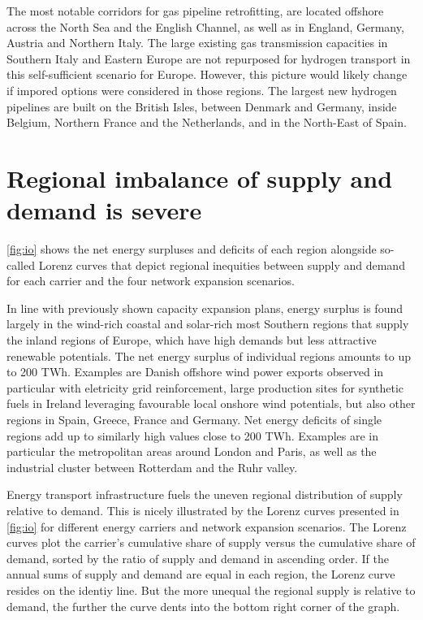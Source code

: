 The most notable corridors for gas pipeline retrofitting, are located offshore
across the North Sea and the English Channel, as well as in England, Germany,
Austria and Northern Italy. The large existing gas transmission capacities in
Southern Italy and Eastern Europe are not repurposed for hydrogen transport in
this self-sufficient scenario for Europe. However, this picture would likely
change if impored options were considered in those regions. The largest new
hydrogen pipelines are built on the British Isles, between Denmark and Germany,
inside Belgium, Northern France and the Netherlands, and in the North-East of
Spain.


\section*{Regional imbalance of supply and demand is severe}
\label{sec:imbalance}

\cref{fig:io} shows the net energy surpluses and deficits of each region
alongside so-called Lorenz curves that depict regional inequities between supply
and demand for each carrier and the four network expansion scenarios.

In line with previously shown capacity expansion plans, energy surplus is found
largely in the wind-rich coastal and solar-rich most Southern regions that
supply the inland regions of Europe, which have high demands but less attractive
renewable potentials. The net energy surplus of individual regions amounts to up
to 200 TWh. Examples are Danish offshore wind power exports observed in
particular with eletricity grid reinforcement, large production sites for
synthetic fuels in Ireland leveraging favourable local onshore wind potentials,
but also other regions in Spain, Greece, France and Germany. Net energy deficits
of single regions add up to similarly high values close to 200 TWh. Examples are
in particular the metropolitan areas around London and Paris, as well as the
industrial cluster between Rotterdam and the Ruhr valley.

Energy transport infrastructure fuels the uneven regional distribution of supply
relative to demand. This is nicely illustrated by the Lorenz curves presented in
\cref{fig:io} for different energy carriers and network expansion scenarios. The
Lorenz curves plot the carrier's cumulative share of supply versus the
cumulative share of demand, sorted by the ratio of supply and demand in
ascending order. If the annual sums of supply and demand are equal in each
region, the Lorenz curve resides on the identiy line. But the more unequal the
regional supply is relative to demand, the further the curve dents into the
bottom right corner of the graph.

